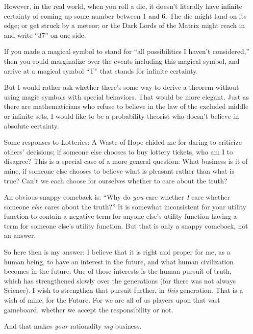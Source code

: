 {
 However, in the real world, when you roll a die, it
doesn't literally have infinite certainty of coming up
some number between 1 and 6. The die might land on its edge; or get
struck by a meteor; or the Dark Lords of the Matrix might reach in and
write ``37'' on one side.}

{
 If you made a magical symbol to stand for ``all
possibilities I haven't considered,''
then you could marginalize over the events including this magical
symbol, and arrive at a magical symbol
``T'' that stands for infinite
certainty.}

{
 But I would rather ask whether there's some way to
derive a theorem without using magic symbols with special behaviors.
That would be more elegant. Just as there are mathematicians who refuse
to believe in the law of the excluded middle or infinite sets, I would
like to be a probability theorist who doesn't believe
in absolute certainty.}

\myendsectiontext


{
 Some responses to Lotteries: A Waste of Hope chided me for daring
to criticize others' decisions; if someone else chooses
to buy lottery tickets, who am I to disagree? This is a special case of
a more general question: What business is it of mine, if someone else
chooses to believe what is pleasant rather than what is true?
Can't we each choose for ourselves whether to care
about the truth? }

{
 An obvious snappy comeback is: ``Why do
\textit{you} care whether \textit{I} care whether someone \textit{else}
cares about the truth?'' It is somewhat inconsistent
for your utility function to contain a negative term for anyone
else's utility function having a term for someone
else's utility function. But that is only a snappy
comeback, not an answer.}

{
 So here then is my answer: I believe that it is right and proper
for me, as a human being, to have an interest in the future, and what
human civilization becomes in the future. One of those interests is the
human pursuit of truth, which has strengthened slowly over the
generations (for there was not always Science). I wish to strengthen
that pursuit further, in \textit{this} generation. That is a wish of
mine, for the Future. For we are all of us players upon that vast
gameboard, whether we accept the responsibility or not.}

{
 And that makes \textit{your} rationality \textit{my} business.}

